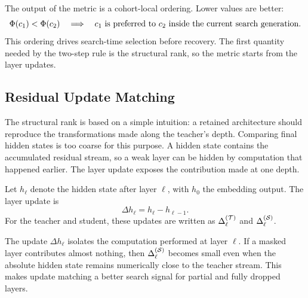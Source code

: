 The output of the metric is a cohort-local ordering. Lower values are better:
\[
\Phi(c_1) < \Phi(c_2)
\quad\Longrightarrow\quad
c_1 \text{ is preferred to } c_2
\text{ inside the current search generation.}
\]
This ordering drives search-time selection before recovery. The first quantity needed by the two-step rule is the structural rank, so the metric starts from the layer updates.

\subsection{Residual Update Matching}

The structural rank is based on a simple intuition: a retained architecture should reproduce the transformations made along the teacher's depth. Comparing final hidden states is too coarse for this purpose. A hidden state contains the accumulated residual stream, so a weak layer can be hidden by computation that happened earlier. The layer update exposes the contribution made at one depth.

Let $h_{\ell}$ denote the hidden state after layer $\ell$, with $h_0$ the embedding output. The layer update is
\begin{equation}
\Delta h_\ell = h_\ell - h_{\ell-1}.
\label{eq:residual_update}
\end{equation}
For the teacher and student, these updates are written as $\Delta^{(\mathcal{T})}_{\ell}$ and $\Delta^{(\mathcal{S})}_{\ell}$.

The update $\Delta h_\ell$ isolates the computation performed at layer $\ell$. If a masked layer contributes almost nothing, then $\Delta^{(\mathcal{S})}_{\ell}$ becomes small even when the absolute hidden state remains numerically close to the teacher stream. This makes update matching a better search signal for partial and fully dropped layers.

